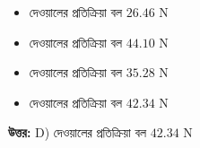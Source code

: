 \documentclass[12pt, a4paper]{article}
\begin{document}
\vspace{1em}

\begin{itemize}[label={}, leftmargin=1cm, itemsep=0.5em]
\item[\textbf{A)}] দেওয়ালের প্রতিক্রিয়া বল $26.46\text{ N}$
\item[\textbf{B)}] দেওয়ালের প্রতিক্রিয়া বল $44.10\text{ N}$
\item[\textbf{C)}] দেওয়ালের প্রতিক্রিয়া বল $35.28\text{ N}$
\item[\textbf{D)}] দেওয়ালের প্রতিক্রিয়া বল $42.34\text{ N}$
\end{itemize}

\vspace{0.5em}
\begin{tcolorbox}[answerbox]
\textbf{\color{success} উত্তর:} D) দেওয়ালের প্রতিক্রিয়া বল $42.34\text{ N}$
\end{tcolorbox}
\vspace{1em}
\end{document}

